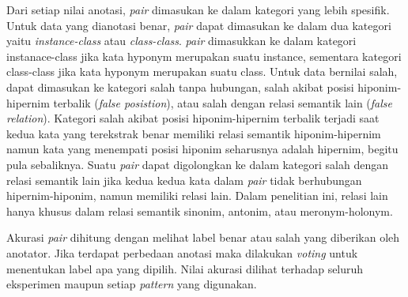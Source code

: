 Dari setiap nilai anotasi, \textit{pair} dimasukan ke dalam kategori yang lebih spesifik. Untuk data yang dianotasi benar, \textit{pair} dapat dimasukan ke dalam dua kategori yaitu \textit{instance-class} atau \textit{class-class}. \textit{pair} dimasukkan ke dalam kategori instanace-class jika kata hyponym merupakan suatu instance, sementara kategori class-class jika kata hyponym merupakan suatu class. Untuk data bernilai salah, dapat dimasukan ke kategori salah tanpa hubungan, salah akibat posisi hiponim-hipernim terbalik (\textit{false posistion}), atau salah dengan relasi semantik lain (\textit{false relation}). Kategori salah akibat posisi hiponim-hipernim terbalik terjadi saat kedua kata yang terekstrak benar memiliki relasi semantik hiponim-hipernim namun kata yang menempati posisi hiponim seharusnya adalah hipernim, begitu pula sebaliknya. Suatu \textit{pair} dapat digolongkan ke dalam kategori salah dengan relasi semantik lain jika kedua kedua kata dalam \textit{pair} tidak berhubungan hipernim-hiponim, namun memiliki relasi lain. Dalam penelitian ini, relasi lain hanya khusus dalam relasi semantik sinonim, antonim, atau meronym-holonym.

Akurasi \textit{pair} dihitung dengan melihat label benar atau salah yang diberikan oleh anotator. Jika terdapat perbedaan anotasi maka dilakukan \textit{voting} untuk menentukan label apa yang dipilih. Nilai akurasi dilihat terhadap seluruh eksperimen maupun setiap \textit{pattern} yang digunakan.

